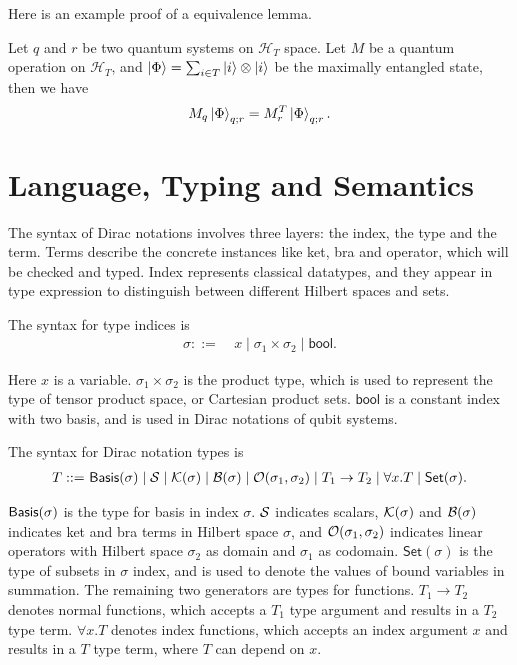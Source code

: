 \documentclass[runningheads]{llncs}
\newcommand{\yx}[1]{\textit{\color{blue}[YX] : #1}}
\begin{document}
Here is an example proof of a equivalence lemma.
\begin{example}
    Let $q$ and $r$ be two quantum systems on $\mathcal{H}_T$ space. Let $M$ be a quantum operation on $\mathcal{H}_T$,
    and $\ket{\Phi} = \sum_{i \in T} \ket{i}\otimes \ket{i}$ be the maximally entangled state, then we have
    \[
    M_q \ket{\Phi}_{q; r} = M_r^T \ket{\Phi}_{q; r}.
    \]
\end{example}




\section{Language, Typing and Semantics}
The syntax of Dirac notations involves three layers: the index, the type and the term.
Terms describe the concrete instances like ket, bra and operator, which will be checked and typed.
Index represents classical datatypes, and they appear in type expression to distinguish between different Hilbert spaces and sets.

\begin{definition}
    The syntax for type indices is
    \begin{align*}
        \sigma ::=\ & x \mid \sigma_1 \times \sigma_2 \mid \mathsf{bool}.
    \end{align*}
\end{definition}
Here $x$ is a variable. $\sigma_1 \times \sigma_2$ is the product type, which is used to represent the type of tensor product space, or Cartesian product sets.
$\mathsf{bool}$ is a constant index with two basis, and is used in Dirac notations of qubit systems.



\begin{definition}
    The syntax for Dirac notation types is
    \begin{align*}
        T ::=\ & \mathsf{Basis}(\sigma) \mid \mathcal{S} \mid \mathcal{K}(\sigma) \mid \mathcal{B}(\sigma) \mid \mathcal{O}(\sigma_1, \sigma_2) \mid T_1 \to T_2 \mid \forall x.T \mid \mathsf{Set}(\sigma). \\
    \end{align*}
\end{definition}
$\mathsf{Basis}(\sigma)$ is the type for basis in index $\sigma$. $\mathcal{S}$ indicates scalars, $\mathcal{K}(\sigma)$ and $\mathcal{B}(\sigma)$ indicates ket and bra terms in Hilbert space $\sigma$, and $\mathcal{O}(\sigma_1, \sigma_2)$ indicates linear operators with Hilbert space $\sigma_2$ as domain and $\sigma_1$ as codomain.
$\mathsf{Set}(\sigma)$ is the type of subsets in $\sigma$ index, and is used to denote the values of bound variables in summation.
The remaining two generators are types for functions. $T_1 \to T_2$ denotes normal functions, which accepts a $T_1$ type argument and results in a $T_2$ type term. $\forall x. T$ denotes index functions, which accepts an index argument $x$ and results in a $T$ type term, where $T$ can depend on $x$.
\end{document}
